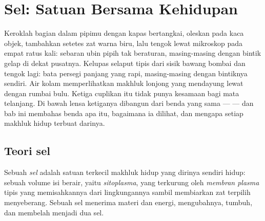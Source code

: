 \chapter{Sel: Satuan Bersama Kehidupan}\label{ch:g10:cells-common-unit}

Keroklah bagian dalam pipimu dengan kapas bertangkai, oleskan pada kaca
objek, tambahkan setetes zat warna biru, lalu tengok lewat mikroskop
pada  empat ratus kali: sebaran ubin pipih tak beraturan,
masing-masing dengan bintik gelap di dekat pusatnya. Kelupas selaput
tipis dari sisik bawang bombai dan tengok lagi: bata persegi panjang
yang rapi, masing-masing dengan bintiknya sendiri. Air kolam
memperlihatkan makhluk lonjong yang mendayung lewat dengan rumbai bulu.
Ketiga cuplikan itu tidak punya kesamaan bagi mata telanjang. Di bawah
lensa ketiganya dibangun dari benda yang sama ---  --- dan bab ini
membahas benda apa itu, bagaimana ia dilihat, dan mengapa setiap
makhluk hidup terbuat darinya.

\section{Teori sel}

\begin{definition}[Sel]\label{def:g10:cells-common-unit:cell}
Sebuah \emph{sel} adalah satuan terkecil makhluk hidup yang
dirinya sendiri hidup: sebuah volume isi berair, yaitu
\emph{sitoplasma}, yang terkurung oleh
\emph{membran plasma} tipis yang memisahkannya
dari lingkungannya sambil membiarkan zat terpilih menyeberang. Sebuah
sel menerima materi dan energi, mengubahnya, tumbuh, dan membelah
menjadi dua sel.
\end{definition}

